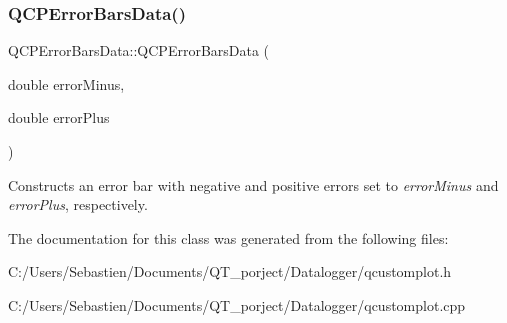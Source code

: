 \subsubsection{\texorpdfstring{Q\+C\+P\+Error\+Bars\+Data()}{QCPErrorBarsData()}\hspace{0.1cm}{\footnotesize\ttfamily [3/3]}}
{\footnotesize\ttfamily Q\+C\+P\+Error\+Bars\+Data\+::\+Q\+C\+P\+Error\+Bars\+Data (\begin{DoxyParamCaption}\item[{double}]{error\+Minus,  }\item[{double}]{error\+Plus }\end{DoxyParamCaption})}

Constructs an error bar with negative and positive errors set to {\itshape error\+Minus} and {\itshape error\+Plus}, respectively. 

The documentation for this class was generated from the following files\+:\begin{DoxyCompactItemize}
\item 
C\+:/\+Users/\+Sebastien/\+Documents/\+Q\+T\+\_\+porject/\+Datalogger/qcustomplot.\+h\item 
C\+:/\+Users/\+Sebastien/\+Documents/\+Q\+T\+\_\+porject/\+Datalogger/qcustomplot.\+cpp\end{DoxyCompactItemize}

